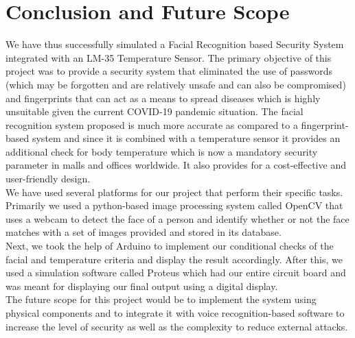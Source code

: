 \documentclass[conference]{IEEEtran}
\begin{document}
	\section{Conclusion and Future Scope}
	We have thus successfully simulated a Facial Recognition
	based Security System integrated with an LM-35 Temperature
	Sensor. The primary objective of this project was to provide a security system that eliminated the use of passwords (which may be forgotten and are relatively unsafe and can also be compromised) and fingerprints that can act as a means to spread diseases which is highly unsuitable given the current COVID-19 pandemic situation. The facial recognition system proposed is much more accurate as compared to a fingerprint-based system and since it is combined with a temperature sensor it
	provides an additional check for body temperature which is now a mandatory security parameter in malls and offices worldwide. It also provides for a cost-effective and user-friendly design.\\
	We have used several platforms for our project that perform their specific tasks. Primarily we used a python-based image processing system called OpenCV that uses a webcam to detect the face of a person and identify whether or not the face matches with a set of images provided and stored in its database.\\ Next, we took the help of Arduino to implement our conditional checks of the facial and temperature criteria and display the result accordingly.
	After this, we used a simulation software called Proteus which had our entire circuit board and was meant for displaying our final output using a digital display.\\
	The future scope for this project would be to implement the system using physical components and to integrate it with voice recognition-based software to increase the level of security as well as the complexity to reduce external attacks.
	
	
\end{document}
